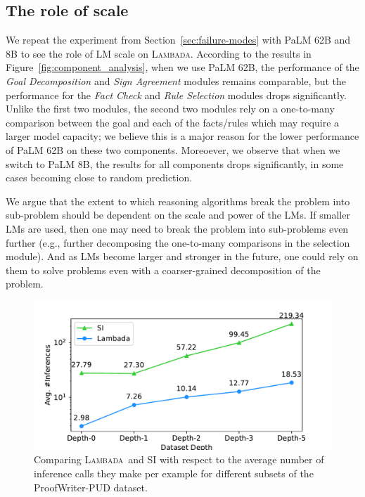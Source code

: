 \documentclass[11pt]{article}
\newcommand{\algo}{\textsc{Lambada}}
\newcommand{\module}[1]{\emph{#1}}
\begin{document}
\subsection{The role of scale}
We repeat the experiment from Section~\ref{sec:failure-modes} with PaLM 62B and 8B to see the role of LM scale on \algo. 
According to the results in Figure~\ref{fig:component_analysis}, when we use PaLM 62B, the performance of the \module{Goal Decomposition} and \module{Sign Agreement} modules remains comparable, but the performance for the \module{Fact Check} and \module{Rule Selection} modules drops significantly. Unlike the first two modules, the second two modules rely on a one-to-many comparison between the goal and each of the facts/rules which may require a larger model capacity; we believe this is a major reason for the lower performance of PaLM 62B on these two components. Moreoever, we observe that when we switch to PaLM 8B, the results for all components drops significantly, in some cases becoming close to random prediction.

We argue that the extent to which reasoning algorithms break the problem into sub-problem should be dependent on the scale and power of the LMs. If smaller LMs are used, then one may need to break the problem into sub-problems even further (e.g., further decomposing the one-to-many comparisons in the selection module). And as LMs become larger and stronger in the future, one could rely on them to solve problems even with a coarser-grained decomposition of the problem.

\begin{figure}[t]
  \centering
  \includegraphics[width=\columnwidth]{call_count.pdf}
  \caption{%
  \label{fig:call_count} %
    Comparing \algo\ and SI with respect to the average number of inference calls they make per example for different subsets of the ProofWriter-PUD dataset.
  }
  \label{fig:pud}
\end{figure}
\end{document}
